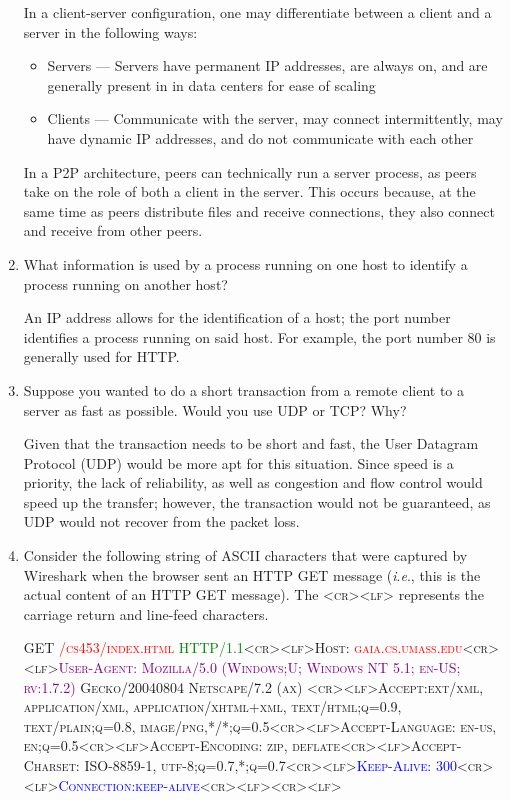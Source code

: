 \begin{enumerate}
    In a client-server configuration, one may differentiate between a client and a server in the following ways:

    \begin{itemize}

      \item Servers — Servers have permanent IP addresses, are always on, and are generally present in in data centers for ease of scaling

      \item Clients — Communicate with the server, may connect intermittently, may have dynamic IP addresses, and do not communicate with each other

    \end{itemize}

    In a P2P architecture, peers can technically run a server process, as peers take on the role of both a client in the server. This occurs because, at the same time as peers distribute files and receive connections, they also connect and receive from other peers.
    
  \item What information is used by a process running on one host to identify a process running on another host?

    An IP address allows for the identification of a host; the port number identifies a process running on said host. For example, the port number 80 is generally used for HTTP.
    
  \item Suppose you wanted to do a short transaction from a remote client to a server as fast as possible. Would you use UDP or TCP? Why?

    Given that the transaction needs to be short and fast, the User Datagram Protocol (UDP) would be more apt for this situation. Since speed is a priority, the lack of reliability, as well as congestion and flow control would speed up the transfer; however, the transaction would not be guaranteed, as UDP would not recover from the packet loss.
    
  \item Consider the following string of ASCII characters that were captured by Wireshark when the browser sent an HTTP GET message (\textit{i}.\textit{e}., this is the actual content of an HTTP GET message). The \textsc{<cr><lf>} represents the carriage return and line-feed characters.

    \begin{flushleft}
      \textsc{GET \textcolor{red}{/cs453/index.html} \textcolor{green}{HTTP/1.1}<cr><lf>Host: \textcolor{red}{gaia.cs.umass.edu}<cr><lf>\textcolor{purple}{User-Agent: Mozilla/5.0 (Windows;U; Windows NT 5.1; en-US; rv:1.7.2)} Gecko/20040804 Netscape/7.2 (ax) <cr><lf>Accept:ext/xml, application/xml, application/xhtml+xml, text/html;q=0.9, text/plain;q=0.8, image/png,*/*;q=0.5<cr><lf>Accept-Language: en-us, en;q=0.5<cr><lf>Accept-Encoding: zip, deflate<cr><lf>Accept-Charset: ISO-8859-1, utf-8;q=0.7,*;q=0.7<cr><lf>\textcolor{blue}{Keep-Alive: 300}<cr><lf>\textcolor{blue}{Connection:keep-alive}<cr><lf><cr><lf>}
    \end{flushleft}


\end{enumerate}
